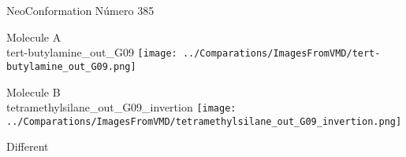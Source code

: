 \vtab[-2cm]
\begin{center}
{\large NeoConformation \tab Número 385}
\end{center}
\begin{multicols}{2}
\begin{center}
Molecule A \\ 
tert-butylamine\_out\_G09
\texttt{[image: ../Comparations/ImagesFromVMD/tert-butylamine\_out\_G09.png]}
\\
\vtab

\columnbreak
Molecule B \\ 
tetramethylsilane\_out\_G09\_invertion
\texttt{[image: ../Comparations/ImagesFromVMD/tetramethylsilane\_out\_G09\_invertion.png]}
\\
\vtab


\end{center}
\end{multicols}
\begin{center}
\vtab
\vtab
\textcolor{NavyBlue}{\Large Different}
\end{center}

 \newpage

